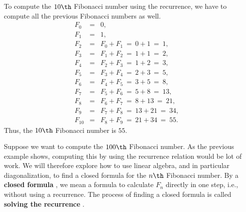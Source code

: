 \begin{solution}
  To compute the $10\th$ Fibonacci number using the recurrence, we
  have to compute all the previous Fibonacci numbers as well.
  \begin{eqnarray*}
    F_0 &=& 0, \\
    F_1 &=& 1, \\
    F_2 &=& F_0 + F_1 ~=~ 0 + 1 ~=~ 1, \\
    F_3 &=& F_1 + F_2 ~=~ 1 + 1 ~=~ 2, \\
    F_4 &=& F_2 + F_3 ~=~ 1 + 2 ~=~ 3, \\
    F_5 &=& F_3 + F_4 ~=~ 2 + 3 ~=~ 5, \\
    F_6 &=& F_4 + F_5 ~=~ 3 + 5 ~=~ 8, \\
    F_7 &=& F_5 + F_6 ~=~ 5 + 8 ~=~ 13, \\
    F_8 &=& F_6 + F_7 ~=~ 8 + 13 ~=~ 21, \\
    F_9 &=& F_7 + F_8 ~=~ 13 + 21 ~=~ 34, \\
    F_{10} &=& F_8 + F_9 ~=~ 21 + 34 ~=~ 55.
  \end{eqnarray*}
  Thus, the $10\th$ Fibonacci number is $55$.
\end{solution}

Suppose we want to compute the $100\th$ Fibonacci number. As the
previous example shows, computing this by using the recurrence
relation would be lot of work. We will therefore explore how to use
linear algebra, and in particular diagonalization, to find a closed
formula for the $n\th$ Fibonacci number. By a \textbf{closed formula}%
%
, we mean a formula to calculate $F_n$ directly
in one step, i.e., without using a recurrence. The process of finding
a closed formula is called \textbf{solving the recurrence}%
.


